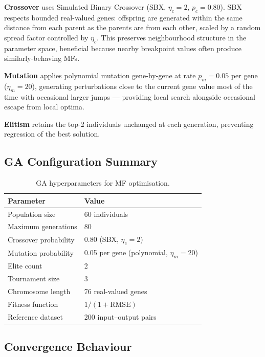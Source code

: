 \documentclass[10pt,twocolumn,a4paper]{article}
\begin{document}
\textbf{Crossover} uses Simulated Binary Crossover (SBX, $\eta_c\!=\!2$, $p_c\!=\!0.80$). SBX respects bounded real-valued genes: offspring are generated within the same distance from each parent as the parents are from each other, scaled by a random spread factor controlled by $\eta_c$. This preserves neighbourhood structure in the parameter space, beneficial because nearby breakpoint values often produce similarly-behaving MFs.

\textbf{Mutation} applies polynomial mutation gene-by-gene at rate $p_m\!=\!0.05$ per gene ($\eta_m\!=\!20$), generating perturbations close to the current gene value most of the time with occasional larger jumps --- providing local search alongside occasional escape from local optima.

\textbf{Elitism} retains the top-2 individuals unchanged at each generation, preventing regression of the best solution.

\subsection{GA Configuration Summary}

\begin{table}[H]
  \centering
  \caption{GA hyperparameters for MF optimisation.}
  \label{tab:ga_params}
  \scriptsize
  \begin{tabularx}{\columnwidth}{lX}
    \toprule
    \textbf{Parameter}   & \textbf{Value} \\
    \midrule
    Population size      & 60 individuals \\
    Maximum generations  & 80 \\
    Crossover probability & 0.80 (SBX, $\eta_c=2$) \\
    Mutation probability & 0.05 per gene (polynomial, $\eta_m=20$) \\
    Elite count          & 2 \\
    Tournament size      & 3 \\
    Chromosome length    & 76 real-valued genes \\
    Fitness function     & $1/(1+\mathrm{RMSE})$ \\
    Reference dataset    & 200 input--output pairs \\
    \bottomrule
  \end{tabularx}
\end{table}

\subsection{Convergence Behaviour}
\end{document}
